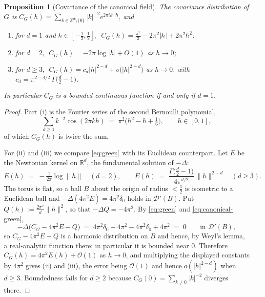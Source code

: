 \documentclass[pdflatex,sn-mathphys,Numbered]{sn-jnl}
\theoremstyle{thmstyleone}%
\newtheorem{proposition}[theorem]{Proposition}%
\theoremstyle{thmstyletwo}%
\theoremstyle{thmstylethree}%
\newcommand{\RR}{\mathbb{R}}
\newcommand{\ZZ}{\mathbb{Z}}
\newcommand{\calO}{\mathcal{O}}
\newcommand{\calD}{\mathcal{D}}
\begin{document}
\begin{proposition}[Covariance of the canonical field]\label{prop:canonical-cov}
The covariance distribution of $G$ is
$C_G(h) = \sum_{k \in \ZZ^d\setminus\{0\}} |k|^{-2} e^{2\pi i k\cdot h}$, and
\begin{enumerate}
\item[(i)] for $d=1$ and $h \in [-\tfrac12,\tfrac12]$,
    $\;C_G(h) = \tfrac{\pi^2}{3} - 2\pi^2|h| + 2\pi^2 h^2$;
\item[(ii)] for $d=2$, $\;C_G(h) = -2\pi\log|h| + O(1)$ as $h \to 0$;
\item[(iii)] for $d \geq 3$,
    $\;C_G(h) = c_d|h|^{2-d} + o\bigl(|h|^{2-d}\bigr)$ as $h \to 0$, with
    $c_d = \pi^{2-d/2}\,\Gamma\bigl(\tfrac d2 - 1\bigr)$.
\end{enumerate}
In particular $C_G$ is a bounded continuous function if and only if $d = 1$.
\end{proposition}

\begin{proof}
Part (i) is the Fourier series of the second Bernoulli polynomial,
\[
    \sum_{k\geq1} k^{-2}\cos(2\pi k h) \;=\; \pi^2\bigl(h^2-h+\tfrac16\bigr),
    \qquad h \in [0,1],
\]
of which $C_G(h)$ is twice the sum.

For (ii) and (iii) we compare \eqref{eq:green} with its Euclidean counterpart.
Let $E$ be the Newtonian kernel on $\RR^d$, the fundamental solution of
$-\Delta$:
\[
    E(h) \;=\; -\tfrac{1}{2\pi}\log\|h\| \quad (d=2), \qquad
    E(h) \;=\; \frac{\Gamma\bigl(\tfrac d2-1\bigr)}{4\pi^{d/2}}\,\|h\|^{2-d}
    \quad (d\geq3) .
\]
The torus is flat, so a ball $B$ about the origin of radius $<\tfrac12$ is
isometric to a Euclidean ball and $-\Delta(4\pi^2 E) = 4\pi^2\delta_0$ holds in
$\calD'(B)$. Put $Q(h) := \tfrac{2\pi^2}{d}\|h\|^2$, so that
$-\Delta Q = -4\pi^2$. By \eqref{eq:green} and \eqref{eq:canonical-green},
\[
    -\Delta\bigl(C_G - 4\pi^2E - Q\bigr) \;=\; 4\pi^2\delta_0 - 4\pi^2
        - 4\pi^2\delta_0 + 4\pi^2 \;=\; 0 \qquad\text{in } \calD'(B) ,
\]
so $C_G - 4\pi^2E - Q$ is a harmonic distribution on $B$ and hence, by Weyl's
lemma, a real-analytic function there; in particular it is bounded near $0$.
Therefore $C_G(h) = 4\pi^2 E(h) + \calO(1)$ as $h \to 0$, and multiplying the
displayed constants by $4\pi^2$ gives (ii) and (iii), the error being $\calO(1)$
and hence $o(|h|^{2-d})$ when $d\geq3$. Boundedness fails for $d \geq 2$ because
$C_G(0) = \sum_{k \neq 0}|k|^{-2}$ diverges there.
\end{proof}
\end{document}
